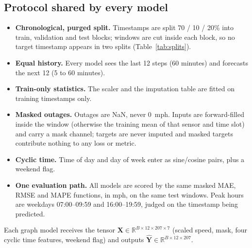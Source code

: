 \documentclass[11pt,a4paper]{article}
\newcommand{\mph}{~mph}
\begin{document}
\subsection{Protocol shared by every model}
\begin{itemize}
\item \textbf{Chronological, purged split.} Timestamps are split 70 / 10 / 20\% into train, validation and test blocks;
windows are cut inside each block, so no target timestamp appears in two splits (Table~\ref{tab:splits}).
\item \textbf{Equal history.} Every model sees the last 12 steps (60 minutes) and forecasts the next 12 (5 to 60 minutes).
\item \textbf{Train-only statistics.} The scaler and the imputation table are fitted on training timestamps only.
\item \textbf{Masked outages.} Outages are NaN, never 0\mph. Inputs are forward-filled inside the window (otherwise the
training mean of that sensor and time slot) and carry a mask channel; targets are never imputed and masked targets
contribute nothing to any loss or metric.
\item \textbf{Cyclic time.} Time of day and day of week enter as sine/cosine pairs, plus a weekend flag.
\item \textbf{One evaluation path.} All models are scored by the same masked MAE, RMSE and MAPE functions, in mph, on the
same test windows. Peak hours are weekdays 07:00--09:59 and 16:00--19:59, judged on the timestamp being predicted.
\end{itemize}
Each graph model receives the tensor $\bm X\in\mathbb R^{B\times 12\times 207\times 7}$ (scaled speed, mask, four cyclic
time features, weekend flag) and outputs $\hat{\bm Y}\in\mathbb R^{B\times 12\times 207}$.

\begin{table}[htbp]
\centering
\caption{Chronological splits used by every model (strict protocol).}
\label{tab:splits}
\small

\end{table}
\end{document}
